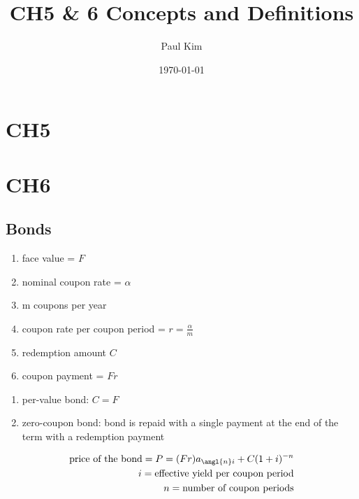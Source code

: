 \documentclass[12pt]{article}
\begin{document}
	
\title{CH5 \& 6 Concepts and Definitions}
\author{Paul Kim}
\date{\today}
\maketitle

\section{CH5}



\section{CH6}

\subsection{Bonds}
\begin{enumerate}
	\item face value = $F$
	\item nominal coupon rate = $\alpha$
	\item m coupons per year 
	\item coupon rate per coupon period = $r = \frac{\alpha}{m}$
	\item redemption amount $C$
	\item coupon payment = $Fr$
	
\end{enumerate}
\begin{enumerate}
	\item per-value bond: $C =F$
	\item zero-coupon bond: bond is repaid with a single payment at the end of the term with a redemption payment 
\end{enumerate}
\begin{align}
	\text{price of the bond} = P = (Fr)a_{\angl{n}i} + C(1+i)^{-n} \nonumber \\
	i = \text{effective yield per coupon period} \nonumber \\
	n = \text{number of coupon periods}
\end{align}
\end{document}
